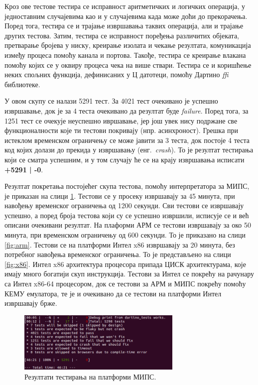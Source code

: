 \documentclass[12pt,oneside]{memoir}
\begin{document}
Кроз ове тестове тестира се исправност аритметичких и логичких операција, у једноставним случајевима као и у случајевима када може доћи до прекорачења. Поред тога, тестира се и трајање извршавања таквих операција, али и трајање других тестова. Затим, тестира се исправност поређења различитих објеката, претварање бројева у ниску, креирање изолата и чекање резултата, комуникација између процеса помоћу канала и портова. Такође, тестира се креирање влакана помоћу којих се у оквиру процеса чека на више ствари. Тестира се и коришћење неких спољних функција, дефинисаних у Ц датотеци, помоћу Дартино \textit{ffi} библиотеке. 

У овом скупу се налази 5291 тест. За 4021 тест очекивано је успешно извршавање, док је за 4 теста очекивано да резултат буде \textit{failure}. Поред тога, за 1251 тест се очекује неуспешно ивршавање, јер још увек нису подржане све функционалности које ти тестови покривају (нпр. асинхроност). Грешка при истеклом временском ограничењу се може јавити за 3 теста, док постоје 4 теста код којих долази до прекида у извршавању (енг.~\textit{crash}). То је резултат тестирања који се сматра успешним, и у том случају ће се на крају извршавања исписати \textbf{+5291 | -0}.

Резултат покретања постојећег скупа тестова, помоћу интерпретатора за МИПС, је приказан на слици \ref{fig:mips}. Тестови се у просеку извршавају за 45 минута, при навођењу временског ограничења од 1200 секунди. Сви тестови се извршавају успешно, а поред броја тестова који су се успешно извршили, исписује се и већ описани очекивани резултат. На плаформи АРМ се тестови извршавају за око 50 минута, при временском ограничењу од 600 секунди. То је приказано на слици \ref{fig:arm}.
Тестови се на платформи Интел x86 извршавају за 20 минута, без потребног навођења временског ограничења. То је представљено на слици \ref{fig:x86}. Интел x86 архитектура процесора припада ЦИСК архитектурама, које имају много богатији скуп инструкција. Тестови за Интел се покрећу на рачунару са Интел x86-64 процесором, док се тестови за АРМ и МИПС покрећу помоћу КЕМУ емулатора, те је и очекивано да се тестови на платформи Интел извршавају брже.

\begin{figure}[!ht]
  \centering
  \includegraphics[width=0.7\textwidth]{testovi-mips.png}
  \caption{Резултати тестирања на платформи МИПС.}
  \label{fig:mips}
\end{figure}
\end{document}
